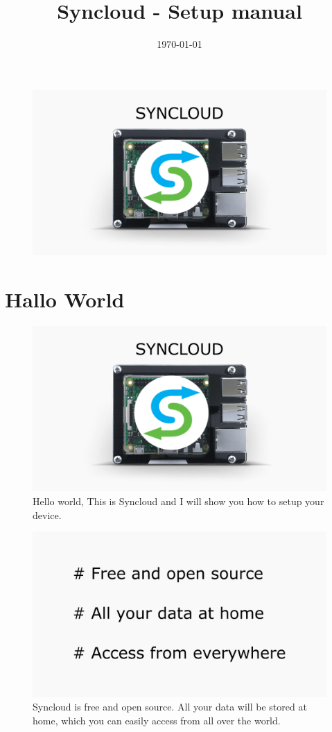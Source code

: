 \documentclass[a4paper,12pt]{article}
\begin{document}
\title{Syncloud - Setup manual}
\date{\today}

\maketitle

\begin{figure}[htbp!]
	\centering
	\includegraphics[width=0.7\linewidth]{../frames/1.png}
\end{figure}

\pagebreak

\section{Hallo World}

\begin{figure}[htbp!]
	\centering
	\includegraphics[width=0.7\linewidth]{../frames/1.png}
	\caption{Hello world,
		This is Syncloud and I will show you how to setup your device.}
	\label{fig:1}
\end{figure}

\begin{figure}[htbp!]
	\centering
	\includegraphics[width=0.7\linewidth]{../frames/2.png}
	\caption{Syncloud is free and open source. All your data will be stored at home, which you can easily access from all over the world.}
	\label{fig:2}
\end{figure}
\end{document}
